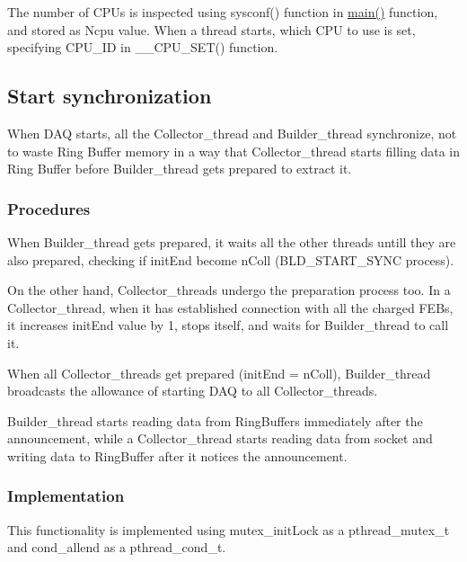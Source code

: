The number of C\+P\+Us is inspected using {\ttfamily sysconf()} function in {\ttfamily \hyperlink{_master_8cpp_a3c04138a5bfe5d72780bb7e82a18e627}{main()}} function, and stored as {\ttfamily Ncpu} value. When a thread starts, which C\+P\+U to use is set, specifying {\ttfamily C\+P\+U\+\_\+\+I\+D} in {\ttfamily \+\_\+\+\_\+\+C\+P\+U\+\_\+\+S\+E\+T()} function.\hypertarget{index_START_SYNC}{}\subsection{Start synchronization}\label{index_START_SYNC}
When D\+A\+Q starts, all the Collector\+\_\+thread and Builder\+\_\+thread synchronize, not to waste Ring Buffer memory in a way that Collector\+\_\+thread starts filling data in Ring Buffer before Builder\+\_\+thread gets prepared to extract it.\hypertarget{index_START_SYNC_DETAILS}{}\subsubsection{Procedures}\label{index_START_SYNC_DETAILS}

\begin{DoxyItemize}
\item When Builder\+\_\+thread gets prepared, it waits all the other threads untill they are also prepared, checking if {\ttfamily init\+End} become n\+Coll (B\+L\+D\+\_\+\+S\+T\+A\+R\+T\+\_\+\+S\+Y\+N\+C process).
\item On the other hand, Collector\+\_\+threads undergo the preparation process too. In a Collector\+\_\+thread, when it has established connection with all the charged F\+E\+Bs, it increases {\ttfamily init\+End} value by 1, stops itself, and waits for Builder\+\_\+thread to call it.
\item When all Collector\+\_\+threads get prepared ({\ttfamily init\+End} = {\ttfamily n\+Coll}), Builder\+\_\+thread broadcasts the allowance of starting D\+A\+Q to all Collector\+\_\+threads.
\item Builder\+\_\+thread starts reading data from Ring\+Buffers immediately after the announcement, while a Collector\+\_\+thread starts reading data from socket and writing data to Ring\+Buffer after it notices the announcement.
\end{DoxyItemize}\hypertarget{index_START_SYNC_PTHREAD}{}\subsubsection{Implementation}\label{index_START_SYNC_PTHREAD}
This functionality is implemented using {\ttfamily mutex\+\_\+init\+Lock} as a {\ttfamily pthread\+\_\+mutex\+\_\+t} and {\ttfamily cond\+\_\+allend} as a {\ttfamily pthread\+\_\+cond\+\_\+t}.



